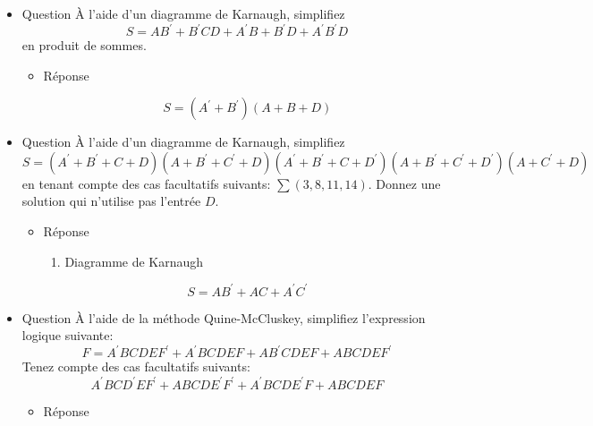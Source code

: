 \documentclass[letter, oneside]{book}
\begin{document}
\begin{itemize}
\item Question
\label{sec:orgfc98515}
À l'aide d'un diagramme de Karnaugh, simplifiez 
$$
S = A B^{\prime} +
B^{\prime} CD + A^{\prime} B + B^{\prime} D + A^{\prime} B^{\prime} D
$$
en produit de sommes.

\begin{itemize}
\item Réponse
\label{sec:orgefa7472}
\begin{center}

\end{center}

$$
  S =  (A^{\prime} +B^{\prime} )(A+B+D)
$$
\end{itemize}

\item Question
\label{sec:org31c31ee}
À l'aide d'un diagramme de Karnaugh, simplifiez 
$$
S = ( A^{\prime} +
B^{\prime} + C + D)(A+B^{\prime} +C^{\prime} +D)(A^{\prime} +B^{\prime}
+C+D^{\prime} )(A+B^{\prime} +C^{\prime} +D^{\prime} )(A+C^{\prime} +D)
$$
en tenant compte des cas facultatifs suivants: \(\sum(3,8,11,14)\).
Donnez une solution qui n'utilise pas l'entrée \(D\).


\begin{itemize}
\item Réponse
\label{sec:org7182080}
\begin{enumerate}
\item Diagramme de Karnaugh
\begin{center}

\end{center}
\end{enumerate}

$$
  S = AB^{\prime}+AC+A^{\prime}C^{\prime}
$$
\end{itemize}

\item Question
\label{sec:orgeeaf281}
À l'aide de la méthode Quine-McCluskey, simplifiez l'expression
logique suivante:
$$
F= A^{\prime} BCDEF^{\prime}  + A^{\prime} BCDEF+ AB^{\prime} CDEF+ ABCDEF^{\prime} 
$$
Tenez compte des cas facultatifs suivants: 
$$
A^{\prime} BCD^{\prime} EF^{\prime} +
ABCDE^{\prime} F^{\prime} + A^{\prime} BCDE^{\prime} F+ ABCDEF
$$

\begin{itemize}
\item Réponse
\label{sec:orgef8992d}


\end{itemize}
\end{itemize}
\end{document}
